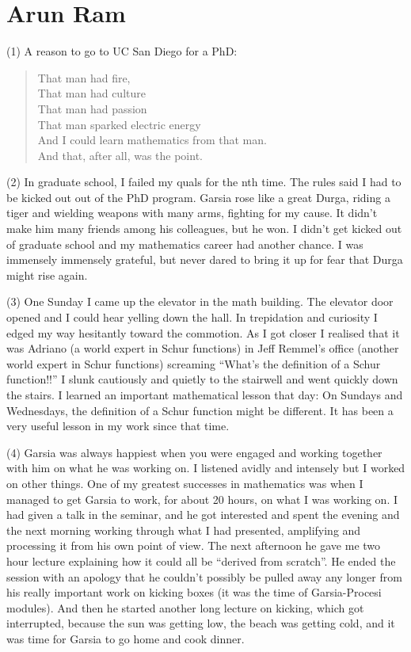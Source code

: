 \documentclass{notices}
\begin{document}
\section*{Arun Ram}
(1)  A reason to go to UC San Diego for a PhD:
\begin{quote}
That man had fire,\\
That man had culture\\
That man had passion\\
That man sparked electric energy\\
And I could learn mathematics from that man.\\
And that, after all, was the point.
\end{quote}

(2) In graduate school, I failed my quals for the nth time.  
The rules said I had to be kicked out out of the PhD program.
Garsia rose like a great Durga,
riding a tiger and wielding weapons with many arms,
fighting for my cause.  
It didn't make him many friends among his colleagues, but he won.
I didn't get kicked out of graduate school and
my mathematics career had another chance.
I was immensely immensely grateful,
but never dared to bring it up
for fear that Durga might rise again.

(3) One Sunday I came up the elevator in the math building.
The elevator door opened and  I could hear yelling down the hall.  
In trepidation and curiosity I edged my way hesitantly toward the commotion.  
As I got closer I realised that it was Adriano (a world expert in Schur functions)
in Jeff Remmel's office (another world expert in Schur functions)
screaming ``What's the definition of a Schur function!!''  
I slunk cautiously and quietly to the stairwell and went quickly down the stairs.
I learned an important mathematical lesson that day:
On Sundays and Wednesdays,
the definition of a Schur function might be different.
It has been a very useful lesson in my work since that time.

(4) Garsia was always happiest when you were engaged and working
together with him on what he was working on.
I listened avidly and intensely but I worked on other things.  
One of my greatest successes in mathematics was
when I  managed to get Garsia to work,
for about 20 hours, on what I was working on.  
I had given a talk in the seminar, and he got interested
and spent the evening and the next morning
working through what I had presented,
amplifying and processing it from his own point of view.    
The next afternoon he gave me two hour lecture explaining
how it could all be ``derived from scratch''.  
He ended the session with an apology
that he couldn't possibly be pulled away any longer
from his really important work on kicking boxes
(it was the time of Garsia-Procesi modules).  
And then he started another long lecture on kicking,
which got interrupted, because
the sun was getting low,
the beach was getting cold,
and it was time for Garsia to go home and cook dinner.
\end{document}
